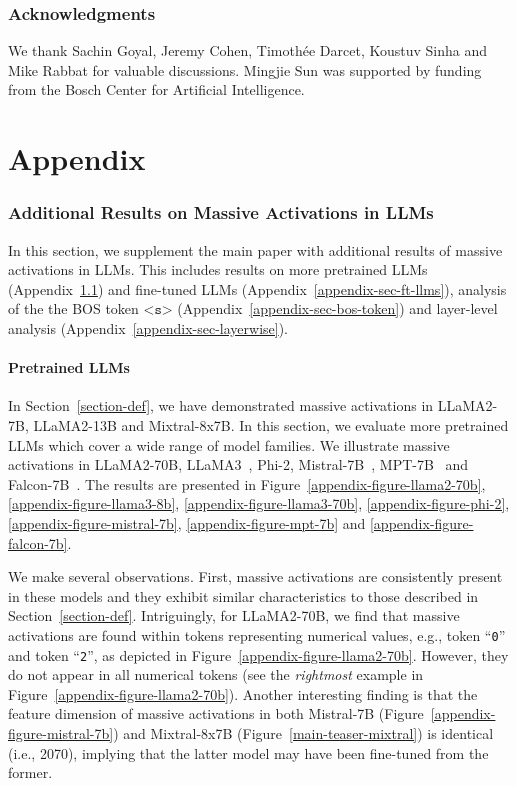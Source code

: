 \documentclass[10pt]{article}
\begin{document}
\section*{Acknowledgments} 
We thank Sachin Goyal, Jeremy Cohen, Timothée Darcet, Koustuv Sinha and Mike Rabbat for valuable discussions. Mingjie Sun was supported by funding from the Bosch Center for Artificial Intelligence. 





\newpage
\appendix

\part{Appendix} 


\section{Additional Results on Massive Activations in LLMs}\label{sec-appendix-existence-massive-activations}
In this section, we supplement the main paper with additional results of massive activations in LLMs. This includes results on more pretrained LLMs (Appendix~\ref{appendix-sec-more-llms}) and fine-tuned LLMs (Appendix~\ref{appendix-sec-ft-llms}), analysis of the the BOS token $\texttt{<s>}$ (Appendix~\ref{appendix-sec-bos-token}) and layer-level analysis (Appendix~\ref{appendix-sec-layerwise}).

\subsection{Pretrained LLMs}\label{appendix-sec-more-llms}
In Section~\ref{section-def}, we have demonstrated massive activations in LLaMA2-7B, LLaMA2-13B and Mixtral-8x7B. In this section, we evaluate more pretrained LLMs which cover a wide range of model families. We illustrate massive activations in LLaMA2-70B, LLaMA3~\citep{Dubey2024llama3}, Phi-2, Mistral-7B~\citep{mistral}, MPT-7B~\citep{MosaicML2023Introducing} and Falcon-7B~\citep{falcon}. The results are presented in Figure~\ref{appendix-figure-llama2-70b}, \ref{appendix-figure-llama3-8b}, \ref{appendix-figure-llama3-70b}, \ref{appendix-figure-phi-2}, \ref{appendix-figure-mistral-7b}, \ref{appendix-figure-mpt-7b}  and \ref{appendix-figure-falcon-7b}. 

We make several observations. First, massive activations are consistently present in these models and they exhibit similar characteristics to those described in Section~\ref{section-def}. Intriguingly, for LLaMA2-70B, we find that massive activations are found within tokens representing numerical values, e.g., token ``\texttt{0}'' and token ``\texttt{2}'', as depicted in Figure~\ref{appendix-figure-llama2-70b}. However, they do not appear in all numerical tokens (see the \textit{rightmost} example in Figure~\ref{appendix-figure-llama2-70b}). Another interesting finding is that the feature dimension of massive activations in both Mistral-7B (Figure~\ref{appendix-figure-mistral-7b}) and Mixtral-8x7B (Figure~\ref{main-teaser-mixtral}) is identical (i.e., 2070), implying that the latter model may have been fine-tuned from the former.
\end{document}
